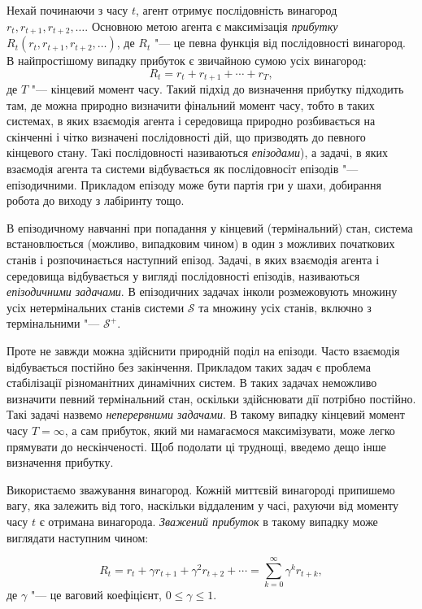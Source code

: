 \documentclass[a4paper,10pt,fleqn]{article}
\begin{document}
Нехай починаючи з часу $t$, агент отримує послідовність винагород $r_{t}, r_{t+1}, r_{t+2}, \ldots$. Основною метою агента є максимізація \emph{прибутку} $R_t(r_t, r_{t+1}, r_{t+2}, \ldots)$, де $R_t$ "--- це певна функція від послідовності винагород. В найпростішому випадку прибуток є звичайною сумою усіх винагород:
\begin{equation}
R_t = r_{t} + r_{t+1} + \cdots + r_T,
\end{equation}
де $T$ "--- кінцевий момент часу. Такий підхід до визначення прибутку підходить там, де можна природно визначити фінальний момент часу, тобто в таких системах, в яких взаємодія агента і середовища природно розбивається на скінченні і чітко визначені послідовності дій, що призводять до певного кінцевого стану. Такі послідовності називаються \emph{епізодами}), а задачі, в яких взаємодія агента та системи відбувається як послідовносіт епізодів "--- епізодичними. Прикладом епізоду може бути партія гри у шахи, добирання робота до виходу з лабіринту тощо.

В епізодичному навчанні при попадання у кінцевий (термінальний) стан, система встановлюється (можливо, випадковим чином) в один з можливих  початкових станів і розпочинається наступний епізод. Задачі, в яких взаємодія агента і середовища відбувається у вигляді послідовності епізодів, називаються \emph{епізодичними задачами}. В епізодичних задачах інколи розмежовують множину усіх нетермінальних станів системи $\mathcal{S}$ та множину усіх станів, включно з термінальними "--- $\mathcal{S^+}$.

Проте не завжди можна здійснити природній поділ на епізоди. Часто взаємодія відбувається постійно без закінчення. Прикладом таких задач є проблема стабілізації різноманітних динамічних систем. В таких задачах неможливо визначити певний термінальний стан, оскільки здійснювати дії потрібно постійно. Такі задачі назвемо \emph{неперервними задачами}. В такому випадку кінцевий момент часу $T=\infty$, а сам прибуток, який ми намагаємося максимізувати, може легко прямувати до нескінченості. Щоб подолати ці труднощі, введемо дещо інше визначення прибутку.

Використаємо зважування винагород. Кожній миттєвій винагороді припишемо вагу, яка залежить від того, наскільки віддаленим у часі, рахуючи від моменту часу $t$ є отримана винагорода. \emph{Зважений прибуток} в такому випадку може виглядати наступним чином:

\begin{equation}
R_t = r_{t} + \gamma r_{t+1} + \gamma^2 r_{t+2} + \cdots = \sum_{k=0}^{\infty}\gamma^k r_{t+k},
\label{eq:weighted-sum}
\end{equation}
де $\gamma$ "--- це ваговий коефіцієнт, $0\leq\gamma\leq 1$.
\end{document}

